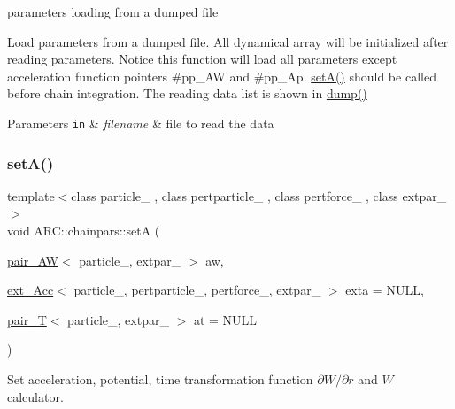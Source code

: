 parameters loading from a dumped file 

Load parameters from a dumped file. All dynamical array will be initialized after reading parameters. Notice this function will load all parameters except acceleration function pointers \#pp\+\_\+\+AW and \#pp\+\_\+\+Ap. \hyperlink{classARC_1_1chainpars_ab66fadaa08cb449e1b49dd58e2d4b14f}{set\+A()} should be called before chain integration. The reading data list is shown in \hyperlink{classARC_1_1chainpars_a926438a652307d24bd8a03b0ca926382}{dump()} 
\begin{DoxyParams}[1]{Parameters}
\mbox{\tt in}  & {\em filename} & file to read the data \\
\hline
\end{DoxyParams}
\hypertarget{classARC_1_1chainpars_ab66fadaa08cb449e1b49dd58e2d4b14f}{}\label{classARC_1_1chainpars_ab66fadaa08cb449e1b49dd58e2d4b14f} 
\subsubsection{\texorpdfstring{set\+A()}{setA()}}
{\footnotesize\ttfamily template$<$class particle\+\_\+ , class pertparticle\+\_\+ , class pertforce\+\_\+ , class extpar\+\_\+ $>$ \\
void A\+R\+C\+::chainpars\+::setA (\begin{DoxyParamCaption}\item[{\hyperlink{namespaceARC_afc1f57a75859038cbd2492366fd1849c}{pair\+\_\+\+AW}$<$ particle\+\_\+, extpar\+\_\+ $>$}]{aw,  }\item[{\hyperlink{namespaceARC_aa423c7d6aff9481c040a20b3c5c6ff4e}{ext\+\_\+\+Acc}$<$ particle\+\_\+, pertparticle\+\_\+, pertforce\+\_\+, extpar\+\_\+ $>$}]{exta = {\ttfamily NULL},  }\item[{\hyperlink{namespaceARC_af6dbf77cf2968752315f7712eb2515a3}{pair\+\_\+T}$<$ particle\+\_\+, extpar\+\_\+ $>$}]{at = {\ttfamily NULL} }\end{DoxyParamCaption})\hspace{0.3cm}{\ttfamily [inline]}}



Set acceleration, potential, time transformation function $\partial W/\partial r$ and $W$ calculator. 

